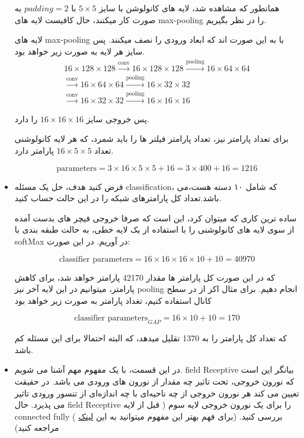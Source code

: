 \begin{itemize}
{	      \begin{qsolve}[]
		      همانطور که مشاهده شد، لایه های کانولوشن با سایز $5\times5$ با $padding=2$ به صورت  کار میکنند، حال کافیست لایه های
		      max-pooling را در نظر بگیریم.

		      لایه های max-pooling با  به این صورت اند که ابعاد ورودی را نصف میکنند. پس سایز هر لایه به صورت زیر خواهد بود.
		      \begin{multline*}
			      16\times128\times128\xrightarrow{\text{conv}}16\times128\times128\xrightarrow{\text{pooling}}16\times64\times64\\
			      \xrightarrow{\text{conv}}16\times64\times64\xrightarrow{\text{pooling}}16\times32\times32\\
			      \xrightarrow{\text{conv}}16\times32\times32\xrightarrow{\text{pooling}}16\times16\times16
		      \end{multline*}

		      پس خروجی سایز $16\times16\times16$ را دارد.

		      برای تعداد پارامتر نیز، تعداد پارامتر فیلتر ها را باید شمرد، که هر لایه کانولوشنی تعداد $16\times5\times5$ پارامتر دارد.

		      \[
			      \text{parameters}=3\times16\times5\times5+16=3\times400+16=1216
		      \]
	      \end{qsolve}
	      }
	\item {
	      فرض کنید هدف، حل یک مسئله classification، که شامل ۱۰ دسته هست،می باشد.تعداد کل پارامترهای
	      شبکه را در این حالت حساب کنید.

	      \begin{qsolve}[]
		      ساده ترین کاری که میتوان کرد، این است که صرفا خروجی فیچر های بدست آمده از سوی لایه های کانولوشنی را
		      با استفاده از یک لایه خطی، به حالت طبقه بندی با softMax در آوریم. در این صورت:

		      \[
			      \text{classifier parameters} = 16\times16\times16\times10 + 10 = 40970
		      \]

		      \splitqsolve
		      که در این صورت کل پارامتر ها مقدار 42170 پارامتر خواهد شد، برای کاهش پارامتر،  میتوانیم در این لایه آخر نیز pooling انجام دهیم.
		      برای مثال اکر از  در سطح کانال استفاده کنیم، تغداد پارامتر به صورت زیر خواهد بود

		      \[
			      \text{classifier parameters}_{GAP} = 16\times10 + 10 = 170
		      \]

		      که تعداد کل پارامتر را به 1370 تقلیل میدهد، که البته احتمالا برای این مسئله کم باشد.
	      \end{qsolve}
	      }
	\item {
	      در این قسمت، با یک مفهوم مهم آشنا می شویم. field Receptive بیانگر این است که نورون خروجی،
	      تحت تاثیر چه مقدار از نورون های ورودی می باشد. در حقیقت تعیین می کند هر نورون خروجی از چه
	      ناحیەای با چه اندازەای از تنسور ورودی تاثیر می پذیرد. حال field Receptive را برای یک نورون
	      خروجی لایه سوم ( قبل از لایه connected fully ( بررسی کنید. (برای فهم بهتر این مفهوم میتوانید به
	      این \href{https://blog.mlreview.com/a-guide-to-receptive-field-arithmetic-for-convolutional-neural-networks-e0f514068807?gi=9a91fd9bda2d}{لینک} مراجعه کنید)

}
\end{itemize}
